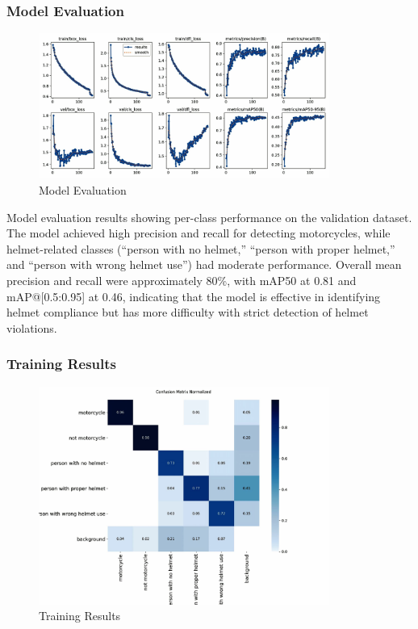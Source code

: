 \begin{refsection}
\begin{refsection}
\subsubsection{Model Evaluation}
\begin{figure}[ht]
    \centering
	\includegraphics[width=0.85\textwidth]{figures/Fig 14.jpg}
	\caption[Model Evaluation]{Model Evaluation}
	\label{fig:model_evaluation}
\end{figure}

\noindent
Model evaluation results showing per-class performance on the validation dataset. The model achieved high precision and recall for detecting motorcycles, while helmet-related classes (“person with no helmet,” “person with proper helmet,” and “person with wrong helmet use”) had moderate performance. Overall mean precision and recall were approximately 80\%, with mAP50 at 0.81 and mAP@[0.5:0.95] at 0.46, indicating that the model is effective in identifying helmet compliance but has more difficulty with strict detection of helmet violations.

\subsubsection{Training Results}
\begin{figure}[ht]
    \centering
	\includegraphics[width=0.85\textwidth]{figures/Fig 15.jpg}
	\caption[Training Results]{Training Results}
	\label{fig:training_results}
\end{figure}


\end{refsection}
\end{refsection}

